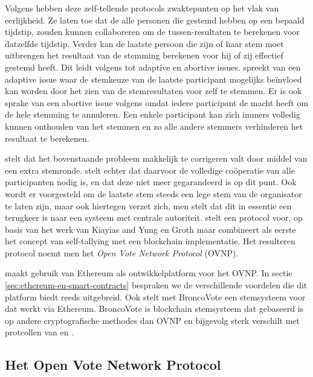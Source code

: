		Volgens \textcite{McCorry2017}  hebben deze zelf-tellende protocols zwaktepunten op het vlak van eerlijkheid. Ze laten toe dat de alle personen die gestemd hebben op een bepaald tijdstip, zouden kunnen collaboreren om de tussen-resultaten te berekenen voor datzelfde tijdstip. Verder kan de laatste persoon die zijn of haar stem moet uitbrengen het resultaat van de stemming berekenen voor hij of zij effectief gestemd heeft. Dit leidt volgens \textcite{McCorry2017} tot adaptive en abortive issues.  \textcite{McCorry2017} spreekt van een adaptive issue waar de stemkeuze van de laatste participant mogelijks beïnvloed kan worden door het zien van de stemresultaten voor zelf te stemmen. Er is ook sprake van een abortive issue volgens \textcite{McCorry2017} omdat iedere participant de macht heeft om de hele stemming te annuleren. Een enkele participant kan zich immers volledig kunnen onthouden van het stemmen en zo alle andere stemmers verhinderen het resultaat te berekenen. 
			
		\textcite{Kiayias2002} stelt dat het bovenstaande probleem makkelijk te corrigeren valt door middel van een extra stemronde. \textcite{McCorry2017} stelt echter dat daarvoor de volledige coöperatie van alle participanten nodig is, en dat deze niet meer gegarandeerd is op dit punt. Ook wordt er voorgesteld om de laatste stem steeds een lege stem van de organisator te laten zijn, maar ook hiertegen verzet \textcite{McCorry2017} zich, men stelt dat dit in essentie een terugkeer is naar een systeem met centrale autoriteit.  \textcite{McCorry2017} stelt een protocol voor, op basis van het werk van Kiayias and Yung en Groth maar combineert als eerste het concept van self-tallying met een blockchain implementatie. Het resulteren protocol noemt men het \textit{Open Vote Network Protocol} (OVNP).
		
		 \textcite{McCorry2017} maakt gebruik van Ethereum als ontwikkelplatform voor het OVNP. In sectie \ref{sec:ethereum-en-smart-contracts} bespraken we de verschillende voordelen die dit platform biedt reeds uitgebreid. Ook \textcite{Dagher2018} stelt met BroncoVote een stemsysteem voor dat werkt via Ethereum. BroncoVote is blockchain stemsysteem dat gebaseerd is op andere cryptografische methodes dan OVNP en bijgevolg sterk verschilt met protcollen van \textcite{Kiayias2002} en \textcite{McCorry2017}. 
	
	\subsection{Het Open Vote Network Protocol}
	\label{sec:OVNP}
